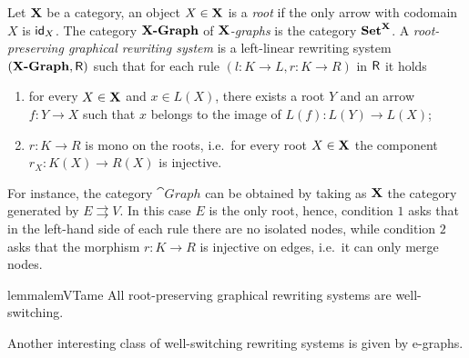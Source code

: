 \begin{definition}
	Let $\textbf {\textup{X}}$ be a category, an object $X\in \textbf {\textup{X}}$ is a \emph{root} if the only arrow with codomain $X$ is $\mathsf{id}_{X}$.
	The category $\textbf{\textup{{X}-Graph}}$ of \emph{$\textbf {\textup{X}}$-graphs} is the category
	$\textbf {\textup{Set}}^{\textbf {\textup{X}}}$. A
	\emph{root-preserving graphical rewriting system} is a left-linear
	rewriting system $(\textbf{\textup{{X}-Graph}}, \mathsf{R})$ such that for each rule
	$(l\colon K\to L, r\colon K\to R)$ in $\mathsf{R}$ it holds
	\begin{enumerate}
		\item for every $X\in \textbf {\textup{X}}$ and $x\in L(X)$, there exists a root $Y$
		and an arrow $f\colon Y\to X$ such that $x$ belongs to the image of
		$L(f)\colon L(Y)\to L(X)$;
		\item $r\colon K\to R$ is mono on the roots, i.e.~for every root $X\in \textbf {\textup{X}}$ the component $r_X:K(X)\to R(X)$ is injective.
	\end{enumerate}
\end{definition}

For instance, the category $\cat{Graph}$ can be obtained
by taking as $\textbf {\textup{X}}$ the category generated by $E \rightrightarrows V$. In this case $E$ is the only root, hence, condition $1$ asks that in the left-hand side of each rule
there are no isolated nodes, while condition $2$ asks that the
morphism $r: K \to R$ is injective on edges, i.e.~it can only merge nodes.

\begin{lemma}{lemma}{lemVTame}
	\label{bono}
	All root-preserving graphical rewriting systems are well-switching.
\end{lemma}

Another interesting class of well-switching rewriting systems is given by e-graphs.

